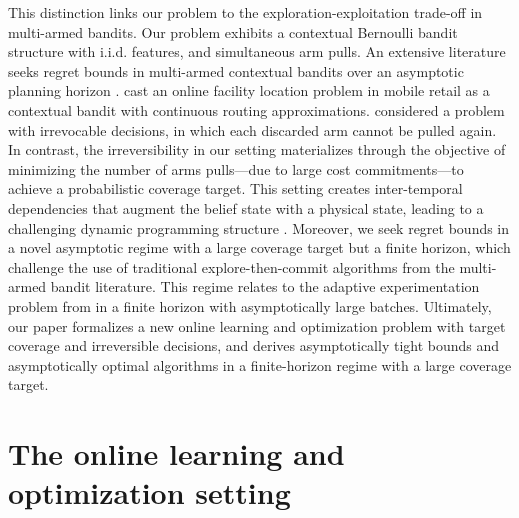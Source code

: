 \documentclass[blindrev]{informs3noheader}
\begin{document}
This distinction links our problem to the exploration-exploitation trade-off in multi-armed bandits. Our problem exhibits a contextual Bernoulli bandit structure with i.i.d. features, and simultaneous arm pulls. An extensive literature seeks regret bounds in multi-armed contextual bandits over an asymptotic planning horizon \citep[see, e.g.,][]{lu2010contextual,rusmevichientong2010linearly,slivkins2011contextual,agarwal2012contextual,magureanu2014lipschitz,combes2017minimal,neu2022lifting,van2024optimal}. \cite{cao2021online} cast an online facility location problem in mobile retail as a contextual bandit with continuous routing approximations. \cite{farias2011irrevocable} considered a problem with irrevocable decisions, in which each discarded arm cannot be pulled again. In contrast, the irreversibility in our setting materializes through the objective of minimizing the number of arms pulls---due to large cost commitments---to achieve a probabilistic coverage target. This setting creates inter-temporal dependencies that augment the belief state with a physical state, leading to a challenging dynamic programming structure \citep{ryzhov2012knowledge,russo2018learning,osband2019deep}. Moreover, we seek regret bounds in a novel asymptotic regime with a large coverage target but a finite horizon, which challenge the use of traditional explore-then-commit algorithms from the multi-armed bandit literature. This regime relates to the adaptive experimentation problem from \cite{che2023adaptive} in a finite horizon with asymptotically large batches. Ultimately, our paper formalizes a new online learning and optimization problem with target coverage and irreversible decisions, and derives asymptotically tight bounds and asymptotically optimal algorithms in a finite-horizon regime with a large coverage target.

\section{The online learning and optimization setting}
\label{sec:setting}
\end{document}
